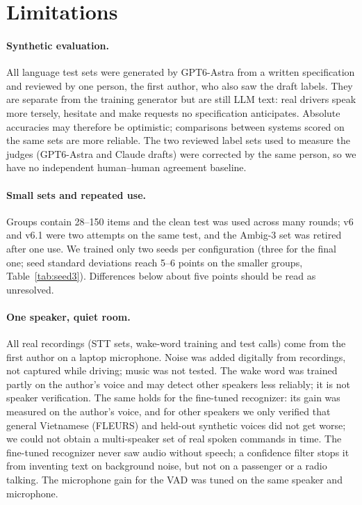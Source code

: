 \section*{Limitations}

\paragraph{Synthetic evaluation.} All language test sets were generated by GPT6-Astra from a written specification and reviewed by
one person, the first author, who also saw the draft labels. They are separate from the training generator but are still LLM
text: real drivers speak more tersely, hesitate and make requests no specification anticipates. Absolute accuracies may
therefore be optimistic; comparisons between systems scored on the same sets are more reliable. The two reviewed label sets
used to measure the judges (GPT6-Astra and Claude drafts) were corrected by the same person, so we have no independent
human--human agreement baseline.

\paragraph{Small sets and repeated use.} Groups contain 28--150 items and the clean test was used across many rounds; v6 and
v6.1 were two attempts on the same test, and the Ambig-3 set was retired after one use. We trained only two seeds per
configuration (three for the final one; seed standard deviations reach 5--6 points on the smaller groups,
Table~\ref{tab:seed3}). Differences below about five points should be read as unresolved.

\paragraph{One speaker, quiet room.} All real recordings (STT sets, wake-word training and test calls) come from the first
author on a laptop microphone. Noise was added digitally from recordings, not captured while driving; music was not tested. The
wake word was trained partly on the author's voice and may detect other speakers less reliably; it is not speaker
verification. The same holds for the fine-tuned recognizer: its gain was measured on the author's voice, and for other
speakers we only verified that general Vietnamese (FLEURS) and held-out synthetic voices did not get worse; we could not obtain
a multi-speaker set of real spoken commands in time. The fine-tuned recognizer never saw audio without speech; a confidence
filter stops it from inventing text on background noise, but not on a passenger or a radio talking. The microphone gain for
the VAD was tuned on the same speaker and microphone.

